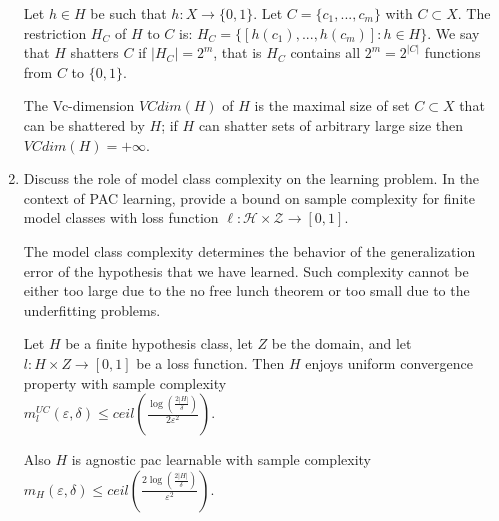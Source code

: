\documentclass[a4paper,11pt,oneside]{book}
\begin{document}
\begin{enumerate}
\begin{solution}
                Let $h \in H$ be such that $h: X \to \{0,1\}$. Let $C = \{c_1,...,c_m\}$ with $C \subset X$. The restriction $H_C$ of $H$ to $C$ is:
                $H_C = \{[h(c_1),...,h(c_m)]: h \in H \}$. We say that $H$ shatters $C$ if $|H_C| = 2^m$, that is $H_C$ contains all $2^m = 2^{|C|}$ functions from $C$ to $\{0,1\}$.
                
                The Vc-dimension $VCdim(H)$ of $H$ is the maximal size of set $C \subset X$ that can be shattered by $H$; if $H$ can shatter sets of arbitrary large size then $VCdim(H) = +\infty$.
            \end{solution}
        \clearpage
        \item Discuss the role of model class complexity on the learning problem. In the context of PAC learning, provide a bound on sample complexity for finite model classes with loss function $\ell: \mathcal{H} \times \mathcal{Z} \to [0,1]$.
            \begin{solution}
                The model class complexity determines the behavior of the generalization error of the hypothesis that we have learned. Such complexity cannot be either too large due to the no free lunch theorem or too small due to the underfitting problems.
                
                Let $H$ be a finite hypothesis class, let $Z$ be the domain, and let $l: H \times Z \to [0,1]$ be a loss function. Then $H$ enjoys uniform convergence property with sample complexity \\ $m_{l}^{UC}(\varepsilon,\delta) \leq ceil(\frac{\log(\frac{2|H|}{\delta})}{2\varepsilon^2})$.
                
                Also $H$ is agnostic pac learnable with sample complexity \\ $m_H(\varepsilon,\delta) \leq ceil(\frac{2\log(\frac{2|H|}{\delta})}{\varepsilon^2})$.
            \end{solution}
    \end{enumerate}
\clearpage
\end{document}

